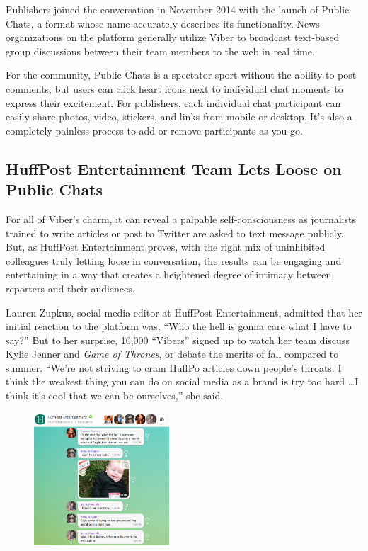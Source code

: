 \documentclass[notoc, symmetric, nobib, nols]{towcenter-guideto-book}
\begin{document}
Publishers joined the conversation in November 2014 with the launch of Public Chats, a format whose name accurately describes its functionality. News organizations on the platform generally utilize Viber to broadcast text-based group discussions between their team members to the web in real time.

For the community, Public Chats is a spectator sport without the ability to post comments, but users can click heart icons next to individual chat moments to express their excitement. For publishers, each individual chat participant can easily share photos, video, stickers, and links from mobile or desktop. It's also a completely painless process to add or remove participants as you go.  

\subsection{HuffPost Entertainment Team Lets Loose on Public Chats}

For all of Viber's charm, it can reveal a palpable self-consciousness as journalists trained to write articles or post to Twitter are asked to text message publicly. But, as HuffPost Entertainment proves, with the right mix of uninhibited colleagues truly letting loose in conversation, the results can be engaging and entertaining in a way that creates a heightened degree of intimacy between reporters and their audiences.

Lauren Zupkus, social media editor at HuffPost Entertainment, admitted that her initial reaction to the platform was, ``Who the hell is gonna care what I have to say?'' But to her surprise, 10,000 ``Vibers'' signed up to watch her team discuss Kylie Jenner and \textit{Game of Thrones}, or debate the merits of fall compared to summer. ``We're not striving to cram HuffPo articles down people's throats. I think the weakest thing you can do on social media as a brand is try too hard \ldots I think it's cool that we can be ourselves,'' she said.  

\begin{figure}
\includegraphics[width=0.45\textwidth]{graphics/CHATAPPS_Page33_Viber.png}
\end{figure}
\end{document}
